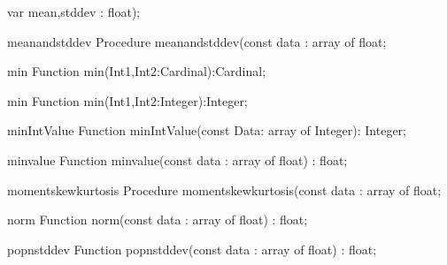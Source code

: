 \FPCexample{}


  var mean,stddev : float);
\begin{procedure}{meanandstddev}
\Declaration
Procedure meanandstddev(const data : array of float;
\Description

\Errors
\SeeAlso
\end{procedure}

\FPCexample{}


\begin{function}{min}
\Declaration
Function min(Int1,Int2:Cardinal):Cardinal;
\Description

\Errors
\SeeAlso
\end{function}

\FPCexample{}


\begin{function}{min}
\Declaration
Function min(Int1,Int2:Integer):Integer;
\Description

\Errors
\SeeAlso
\end{function}

\FPCexample{}


\begin{function}{minIntValue}
\Declaration
Function minIntValue(const Data: array of Integer): Integer;
\Description

\Errors
\SeeAlso
\end{function}

\FPCexample{}


\begin{function}{minvalue}
\Declaration
Function minvalue(const data : array of float) : float;
\Description

\Errors
\SeeAlso
\end{function}

\FPCexample{}


\begin{procedure}{momentskewkurtosis}
\Declaration
Procedure momentskewkurtosis(const data : array of float;
\Description

\Errors
\SeeAlso
\end{procedure}

\FPCexample{}


\begin{function}{norm}
\Declaration
Function norm(const data : array of float) : float;
\Description

\Errors
\SeeAlso
\end{function}

\FPCexample{}


\begin{function}{popnstddev}
\Declaration
Function popnstddev(const data : array of float) : float;
\Description

\Errors
\SeeAlso
\end{function}

